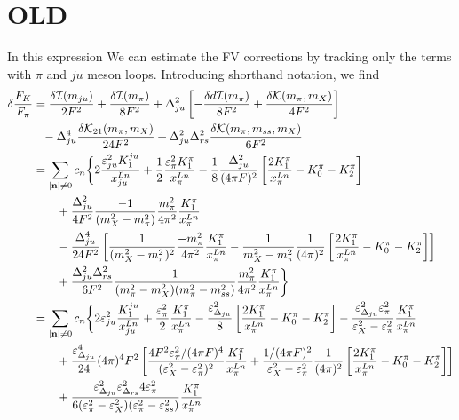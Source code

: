 \documentclass[prd,11pt,tightenlines,preprintnumbers,showpacs,superscriptaddress,notitlepage,nofootinbib,eqsecnum,floatfix]{revtex4-1}
\begin{document}
\section{OLD}
In this expression
We can estimate the FV corrections by tracking only the terms with $\pi$ and $ju$ meson loops.
Introducing shorthand notation, we find
\begin{align}
\d \frac{F_K}{F_\pi} &= 
	\frac{\d\mc{I(m_{ju})}}{2F^2}
	+\frac{\d\mc{I}(m_\pi)}{8F^2}
	+\D_{ju}^2 \left[ -\frac{\d d\mc{I}(m_\pi)}{8F^2} + \frac{\d\mc{K(}m_\pi,m_X)}{4F^2} \right]
\nonumber\\&\phantom{=}
	-\D_{ju}^4 \frac{\d\mc{K}_{21}(m_\pi,m_X)}{24 F^2}
	+\D_{ju}^2\D_{rs}^2 \frac{\d\mc{K}(m_\pi, m_{ss}, m_X)}{6F^2}
\nonumber\\&= \sum_{|\mathbf{n}|\neq0} c_n \bigg\{
	2\frac{\e_{ju}^2 K_1^{ju}}{x^{Ln}_{ju}}
	+\frac{1}{2}\frac{\e_{\pi}^2 K_1^\pi}{x^{Ln}_{\pi}}
	-\frac{1}{8}\frac{\D_{ju}^2}{(4\pi F)^2} \left[
		\frac{2K_1^\pi}{x^{Ln}_{\pi}}
		-K_0^\pi
		-K_2^\pi
	\right]
\nonumber\\&\qquad 
	+\frac{\D_{ju}^2}{4F^2} \frac{-1}{(m_X^2-m_\pi^2)} \frac{m_\pi^2}{4\pi^2} \frac{K_1^\pi}{x^{Ln}_{\pi}}
\nonumber\\&\qquad 
	-\frac{\D_{ju}^4}{24F^2} \left[
	\frac{1}{(m_X^2-m_\pi^2)^2}\frac{-m_\pi^2}{4\pi^2} \frac{K_1^\pi}{x^{Ln}_{\pi}}
	-\frac{1}{m_X^2 -m_\pi^2}\frac{1}{(4\pi)^2} \left[
		\frac{2K_1^\pi}{x^{Ln}_{\pi}}
		-K_0^\pi
		-K_2^\pi
	\right]
	\right]
\nonumber\\&\qquad 
	+\frac{\D_{ju}^2\D_{rs}^2}{6F^2} \frac{1}{(m_\pi^2-m_X^2)(m_\pi^2-m_{ss}^2)}
	\frac{m_\pi^2}{4\pi^2} \frac{K_1^\pi}{x^{Ln}_{\pi}}
	\bigg\}
\nonumber\\&= \sum_{|\mathbf{n}|\neq0} c_n \bigg\{
	2\e_{ju}^2\frac{K_1^{ju}}{x^{Ln}_{ju}}
	+\frac{\e_{\pi}^2}{2}\frac{K_1^\pi}{x^{Ln}_{\pi}}
	-\frac{\e_{\D_{ju}}^2}{8} \left[
		\frac{2K_1^\pi}{x^{Ln}_{\pi}}
		-K_0^\pi
		-K_2^\pi
	\right]
	-\frac{\e_{\D_{ju}}^2 \e_\pi^2}{\e_X^2-\e_\pi^2} \frac{K_1^\pi}{x^{Ln}_{\pi}}
\nonumber\\&\qquad 
	+\frac{\e_{\D_{ju}}^4}{24}(4\pi)^4F^2 \left[
	\frac{4F^2\e_\pi^2 / (4\pi F)^4}{(\e_X^2-\e_\pi^2)^2} \frac{K_1^\pi}{x^{Ln}_{\pi}}
	+\frac{1/(4\pi F)^2}{\e_X^2 -\e_\pi^2}\frac{1}{(4\pi)^2} \left[
		\frac{2K_1^\pi}{x^{Ln}_{\pi}}
		-K_0^\pi
		-K_2^\pi
	\right]
	\right]
\nonumber\\&\qquad 
	+\frac{\e_{\D_{ju}}^2\e_{\D_{rs}}^2 4\e_\pi^2}{6(\e_\pi^2-\e_X^2)(\e_\pi^2-\e_{ss}^2)}
	 \frac{K_1^\pi}{x^{Ln}_{\pi}}

\end{align}
\end{document}
